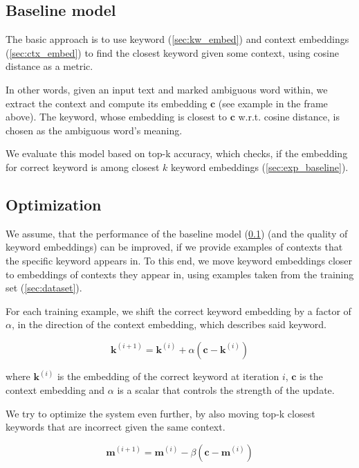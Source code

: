 \documentclass{llncs}
\begin{document}
\subsection{Baseline model}
\label{sec:baseline_model}
The basic approach is to use keyword (\ref{sec:kw_embed}) and context embeddings (\ref{sec:ctx_embed}) to find the closest keyword given some context, using cosine distance as a metric.

In other words, given an input text and marked ambiguous word within, we extract the context and compute its embedding \(\bm{c}\) (see example in the frame above). The keyword, whose embedding is closest to \(\bm{c}\) w.r.t. cosine distance, is chosen as the ambiguous word's meaning.

We evaluate this model based on top-k accuracy, which checks, if the embedding for correct keyword is among closest \(k\) keyword embeddings (\ref{sec:exp_baseline}).


\subsection{Optimization}
\label{sec:optimization}
We assume, that the performance of the baseline model (\ref{sec:baseline_model}) (and the quality of keyword embeddings) can be improved, if we provide examples of contexts that the specific keyword appears in. To this end, we move keyword embeddings closer to embeddings of contexts they appear in, using examples taken from the training set (\ref{sec:dataset}).

For each training example, we shift the correct keyword embedding by a factor of \(\alpha\), in the direction of the context embedding, which describes said keyword.

\begin{equation}
    \label{eq:alpha_optimization}
    \bm{k}^{(i+1)} = \bm{k}^{(i)} + \alpha(\bm{c} - \bm{k}^{(i)})
\end{equation}

where \(\bm{k}^{(i)}\) is the embedding of the correct keyword at iteration \(i\), \(\bm{c}\) is the context embedding and \(\alpha\) is a scalar that controls the strength of the update.

\smallskip
We try to optimize the system even further, by also moving top-k closest keywords that are incorrect given the same context.

\begin{equation}
    \label{eq:beta_optimization}
    \bm{m}^{(i+1)} = \bm{m}^{(i)} - \beta(\bm{c} - \bm{m}^{(i)})
\end{equation}
\end{document}
